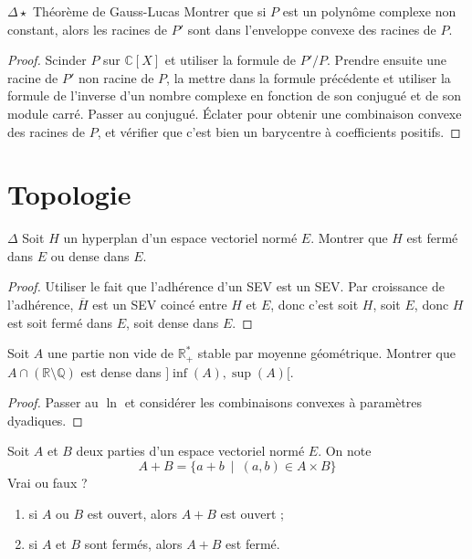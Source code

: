 \documentclass[french,a4paper]{article}
\newcommand{\Q}{\mathbb{Q}}
\newcommand{\R}{\mathbb{R}}
\newcommand{\C}{\mathbb{C}}
\newcommand{\st}{^*}
\theoremstyle{plain}
\theoremstyle{definition}
\theoremstyle{remark}
\begin{document}
\begin{ex}{$\Delta\star$ Théorème de Gauss-Lucas} Montrer que si $P$ est un polynôme complexe non constant, alors les racines de $P'$ sont dans l'enveloppe convexe des racines de $P$.
\end{ex}
\begin{proof}
	Scinder $P$ sur $\C[X]$ et utiliser la formule de $P'/P$. Prendre ensuite une racine de $P'$ non racine de $P$, la mettre dans la formule précédente et utiliser la formule de l'inverse d'un nombre complexe en fonction de son conjugué et de son module carré. Passer au conjugué. Éclater pour obtenir une combinaison convexe des racines de $P$, et vérifier que c'est bien un barycentre à coefficients positifs.
\end{proof}

\section{Topologie}

\begin{ex}{$\Delta$}
	Soit $H$ un hyperplan d'un espace vectoriel normé $E$. Montrer que $H$ est fermé dans $E$ ou dense dans $E$.
\end{ex}
\begin{proof}
	Utiliser le fait que l'adhérence d'un SEV est un SEV. Par croissance de l'adhérence, $\overline{H}$ est un SEV coincé entre $H$ et $E$, donc c'est soit $H$, soit $E$, donc $H$ est soit fermé dans $E$, soit dense dans $E$.
\end{proof}

\begin{ex}[Guindy]{}
	Soit $A$ une partie non vide de $\R_+\st$ stable par moyenne géométrique. Montrer que $A\cap(\R\setminus\Q)$ est dense dans $]\inf(A),\sup(A)[$.
\end{ex}
\begin{proof}
	Passer au $\ln$ et considérer les combinaisons convexes à paramètres dyadiques.
\end{proof}

\begin{ex}{}
	Soit $A$ et $B$ deux parties d'un espace vectoriel normé $E$. On note $$A+B=\{a+b\ \mid\ (a,b)\in A\times B\}$$ Vrai ou faux ?
	\begin{enumerate}
		\item si $A$ ou $B$ est ouvert, alors $A+B$ est ouvert ;
		\item si $A$ et $B$ sont fermés, alors $A+B$ est fermé.
	\end{enumerate}
\end{ex}
\end{document}
